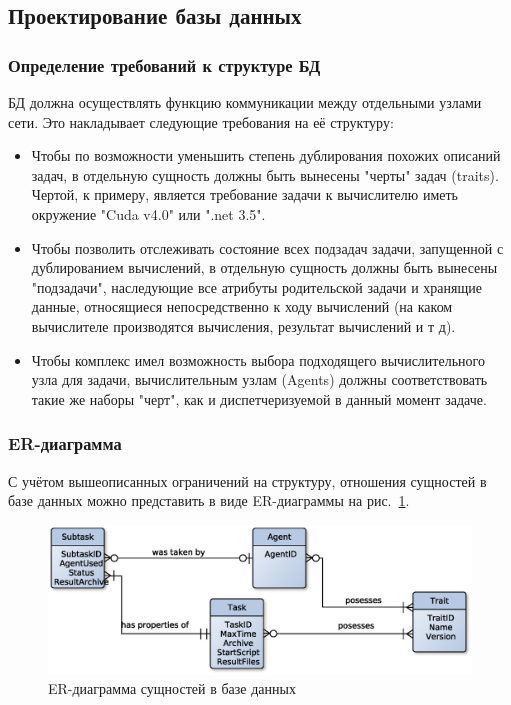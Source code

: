 \documentclass[a4paper,12pt]{report}
\numberwithin{equation}{section}
\begin{document}
\subsection{Проектирование базы данных}
\subsubsection{Определение требований к структуре БД}
БД должна осуществлять функцию коммуникации между отдельными узлами сети.
Это накладывает следующие требования на её структуру:
\begin{itemize}
  \item Чтобы по возможности уменьшить степень дублирования похожих описаний задач, в отдельную сущность должны быть вынесены "черты" задач (traits). Чертой, к примеру, является требование задачи к вычислителю иметь окружение "Cuda v4.0" или ".net 3.5".
  \item Чтобы позволить отслеживать состояние всех подзадач задачи, запущенной с дублированием вычислений, в отдельную сущность должны быть вынесены "подзадачи", наследующие все атрибуты родительской задачи и хранящие данные, относящиеся непосредственно к ходу вычислений (на каком вычислителе производятся вычисления, результат вычислений и т д).
  \item Чтобы комплекс имел возможность выбора подходящего вычислительного узла для задачи, вычислительным узлам (Agents) должны соответствовать такие же наборы "черт", как и диспетчеризуемой в данный момент задаче.
\end{itemize}

\subsubsection{ER-диаграмма}
С учётом вышеописанных ограничений на структуру, отношения сущностей в базе данных можно представить в виде ER-диаграммы на рис.~\ref{fig:db-erd}.

\begin{figure}[h]
    \centering
    \includegraphics[width=\linewidth]{img/DB-ER-Crowsfoot.eps}
    \caption{ER-диаграмма сущностей в базе данных}
    \label{fig:db-erd}
\end{figure}
\end{document}

